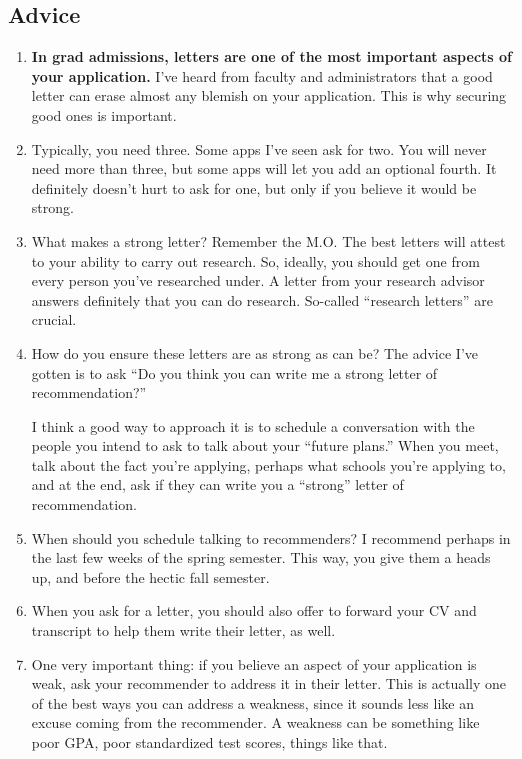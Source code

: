 \documentclass[12pt]{article}
\begin{document}
\subsection{Advice}
\begin{enumerate}
\item \textbf{In grad admissions, letters are one of the most important aspects of your application.} I've heard from faculty and administrators that a good letter can erase almost any blemish on your application. This is why securing good ones is important.

\item Typically, you need three. Some apps I've seen ask for two. You will never need more than three, but some apps will let you add an optional fourth. It definitely doesn't hurt to ask for one, but only if you believe it would be strong.

\item What makes a strong letter? Remember the M.O. The best letters will attest to your ability to carry out research. So, ideally, you should get one from every person you've researched under. A letter from your research advisor answers definitely that you can do research. So-called ``research letters'' are crucial.

\item How do you ensure these letters are as strong as can be? The advice I've gotten is to ask ``Do you think you can write me a strong letter of recommendation?'' 

I think a good way to approach it is to schedule a conversation with the people you intend to ask to talk about your ``future plans.'' When you meet, talk about the fact you're applying, perhaps what schools you're applying to, and at the end, ask if they can write you a ``strong'' letter of recommendation.

\item When should you schedule talking to recommenders? I recommend perhaps in the last few weeks of the spring semester. This way, you give them a heads up, and before the hectic fall semester.

\item When you ask for a letter, you should also offer to forward your CV and transcript to help them write their letter, as well.

\item One very important thing: if you believe an aspect of your application is weak, ask your recommender to address it in their letter. This is actually one of the best ways you can address a weakness, since it sounds less like an excuse coming from the recommender. A weakness can be something like poor GPA, poor standardized test scores, things like that.


\end{enumerate}
\end{document}
